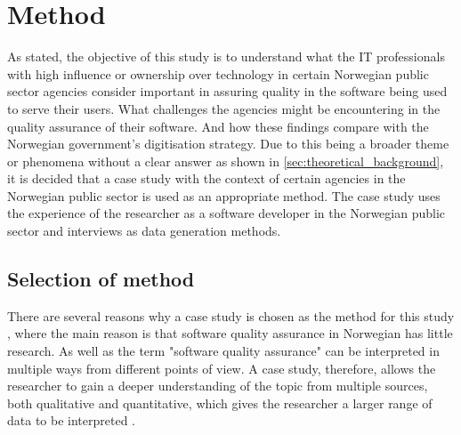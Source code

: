 \chapter{Method} \label{sec:method}


As stated, the objective of this study is to understand what the IT professionals with high influence or ownership over technology in certain Norwegian public sector agencies consider important in assuring quality in the software being used to serve their users. What challenges the agencies might be encountering in the quality assurance of their software. And how these findings compare with the Norwegian government's digitisation strategy. Due to this being a broader theme or phenomena \cite{bjo_2022} without a clear answer as shown in \autoref{sec:theoretical_background}, it is decided that a case study with the context of certain agencies in the Norwegian public sector is used as an appropriate method. The case study uses the experience of the researcher as a software developer in the Norwegian public sector and interviews as data generation methods.

\section{Selection of method}
There are several reasons why a case study is chosen as the method for this study \cite{bjo_2022}, where the main reason is that software quality assurance in Norwegian has little research. As well as the term "software quality assurance" can be interpreted in multiple ways from different points of view. A case study, therefore, allows the researcher to gain a deeper understanding of the topic from multiple sources, both qualitative and quantitative, which gives the researcher a larger range of data to be interpreted \cite{bjo_2022}.

